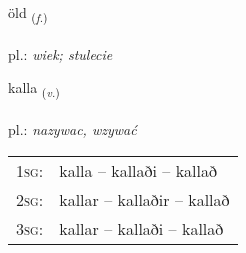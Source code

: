 \documentclass[frontgrid, backgrid]{flacards}\usepackage[]{graphicx}\usepackage[]{xcolor}
\begin{document}
\renewcommand{\flhead}{\vskip5pt \fboxsep=0pt {\small\bfseries\footnotesize Nafnorð | rzeczownik}}
\renewcommand{\fcfoot}{\vskip5pt \fboxsep=0pt \hspace{2pt}{\small\bfseries\footnotesize 1K}}

\renewcommand{\blhead}{\vskip5pt {\small\bfseries\footnotesize Nafnorð | rzeczownik }}
\renewcommand{\bcfoot}{\vskip5pt \hspace{2pt}{\small\bfseries\footnotesize 1K}}


{öld \small{\textsubscript{(\textit{f.})}} \\[1ex] %
\textphonetic{[œlt]} \\
pl.: \emph{wiek; stulecie} \\  [2ex]
\renewcommand*{\arraystretch}{0.8}
}

\renewcommand{\flhead}{\vskip5pt \fboxsep=0pt {\small\bfseries\footnotesize Sagnorð | czasownik}}
\renewcommand{\fcfoot}{\vskip5pt \fboxsep=0pt \hspace{2pt}{\small\bfseries\footnotesize 1K}}

\renewcommand{\blhead}{\vskip5pt {\small\bfseries\footnotesize Sagnorð | czasownik }}
\renewcommand{\bcfoot}{\vskip5pt \hspace{2pt}{\small\bfseries\footnotesize 1K}}


{kalla \small{\textsubscript{(\textit{v.})}} \\[1ex] %
\textphonetic{[kʰatla]} \\
pl.: \emph{nazywac, wzywać} \\  [2ex]
\renewcommand*{\arraystretch}{0.8}
\begin{tabular}{p{1cm}l}
\textsc{1sg}: & kalla -- kallaði -- kallað \\ 
\textsc{2sg}: & kallar -- kallaðir -- kallað \\ 
\textsc{3sg}: & kallar -- kallaði -- kallað \\ 
\end{tabular}
}
\end{document}

